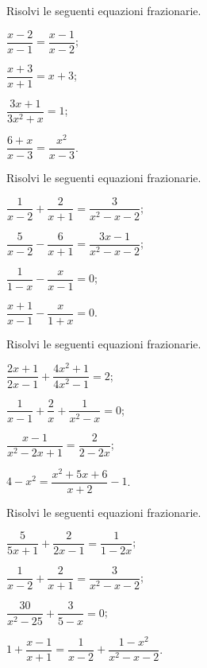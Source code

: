 \begin{esercizio}[\Ast]
\label{ese:18.4}
Risolvi le seguenti equazioni frazionarie.
\begin{multicols}{2}
\begin{enumeratea}
 \item $\dfrac{x-2}{x-1}=\dfrac{x-1}{x-2}$;
 \item $\dfrac{x+3}{x+1}=x+3$;
 \item $\dfrac{3x+1}{3x^{2}+x}=1$;
 \item $\dfrac{6+x}{x-3}=\dfrac{x^{2}}{x-3}$.
\end{enumeratea}
\end{multicols}
\end{esercizio}

\begin{esercizio}[\Ast]
\label{ese:18.5}
Risolvi le seguenti equazioni frazionarie.
\begin{multicols}{2}
\begin{enumeratea}
 \item $\dfrac{1}{x-2}+\dfrac{2}{x+1}=\dfrac{3}{x^{2}-x-2}$;
 \item $\dfrac{5}{x-2}-\dfrac{6}{x+1}=\dfrac{3x-1}{x^{2}-x-2}$;
 \item $\dfrac{1}{1-x}-\dfrac{x}{x-1}=0$;
 \item $\dfrac{x+1}{x-1}-\dfrac{x}{1+x}=0$.
\end{enumeratea}
\end{multicols}
\end{esercizio}

\begin{esercizio}[\Ast]
\label{ese:18.6}
Risolvi le seguenti equazioni frazionarie.
\begin{multicols}{2}
\begin{enumeratea}
 \item $\dfrac{2x+1}{2x-1}+\dfrac{4x^{2}+1}{4x^{2}-1}=2$;
 \item $\dfrac{1}{x-1}+\dfrac{2}{x}+\dfrac{1}{x^{2}-x}=0$;
 \item $\dfrac{x-1}{x^{2}-2x+1}=\dfrac{2}{2-2x}$;
 \item $4-x^{2}=\dfrac{x^{2}+5x+6}{x+2}-1$.
\end{enumeratea}
\end{multicols}
\end{esercizio}

\begin{esercizio}[\Ast]
\label{ese:18.7}
Risolvi le seguenti equazioni frazionarie.
\begin{multicols}{2}
\begin{enumeratea}
 \item $\dfrac{5}{5x+1}+\dfrac{2}{2x-1}=\dfrac{1}{1-2x}$;
 \item $\dfrac{1}{x-2}+\dfrac{2}{x+1}=\dfrac{3}{x^{2}-x-2}$;
 \item $\dfrac{30}{x^{2}-25}+\dfrac{3}{5-x}=0$;
 \item $1+\dfrac{x-1}{x+1}=\dfrac{1}{x-2}+\dfrac{1-x^{2}}{x^{2}-x-2}$.
\end{enumeratea}
\end{multicols}
\end{esercizio}
\pagebreak

